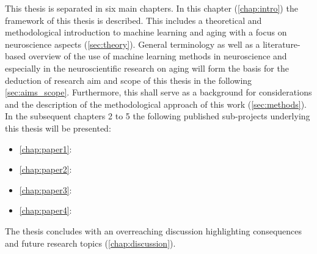 This thesis is separated in six main chapters. In this chapter (\autoref{chap:intro}) the framework of this thesis is described. This includes a theoretical and methodological introduction to machine learning and aging with a focus on neuroscience aspects (\autoref{sec:theory}).  General terminology as well as a literature-based overview of the use of machine learning methods in neuroscience and especially in the neuroscientific research on aging will form the basis for the deduction of research aim and scope of this thesis in the following \autoref{sec:aims_scope}. Furthermore, this shall serve as a background for considerations and the description of the methodological approach of this work (\autoref{sec:methods}). In the subsequent chapters 2 to 5 the following published sub-projects underlying this thesis will be presented:

\begin{itemize}
\item \autoref{chap:paper1}: 
\item \autoref{chap:paper2}: 
\item \autoref{chap:paper3}: 
\item \autoref{chap:paper4}: 
\end{itemize}

The thesis concludes with an overreaching discussion highlighting consequences and future research topics (\autoref{chap:discussion}).
